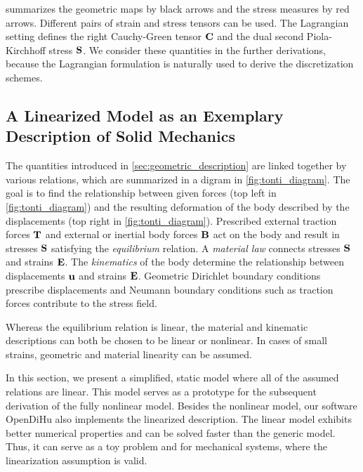  summarizes the geometric maps by black arrows and the stress measures by red arrows. 
Different pairs of strain and stress tensors can be used. 
The Lagrangian setting defines the right Cauchy-Green tensor $\textbf{C}$ and the dual second Piola-Kirchhoff stress $\textbf{S}$.
We consider these quantities in the further derivations, because the Lagrangian formulation is naturally used to derive the discretization schemes.

\subsection{A Linearized Model as an Exemplary Description of Solid Mechanics}\label{sec:linearized_mechanics_model}

The quantities introduced in \cref{sec:geometric_description} are linked together by various relations, which are summarized in a digram in \cref{fig:tonti_diagram}. The goal is to find the relationship between given forces (top left in \cref{fig:tonti_diagram}) and the resulting deformation of the body described by the displacements (top right in \cref{fig:tonti_diagram}).
Prescribed external traction forces $\textbf{T}$ and external or inertial body forces $\textbf{B}$ act on the body and result in stresses $\textbf{S}$ satisfying the \emph{equilibrium} relation. A \emph{material law} connects stresses $\textbf{S}$ and strains $\textbf{E}$. The \emph{kinematics} of the body determine the relationship between displacements $\textbf{u}$ and strains $\textbf{E}$. Geometric Dirichlet boundary conditions prescribe displacements and Neumann boundary conditions such as traction forces contribute to the stress field. 

Whereas the equilibrium relation is linear, the material and kinematic descriptions can both be chosen to be linear or nonlinear. 
In cases of small strains, geometric and material linearity can be assumed.

In this section, we present a simplified, static model where all of the assumed relations are linear. 
This model serves as a prototype for the subsequent derivation of the fully nonlinear model. Besides the nonlinear model, our software OpenDiHu also implements the linearized description. The linear model exhibits better numerical properties and can be solved faster than the generic model. Thus, it can serve as a toy problem and for mechanical systems, where the linearization assumption is valid.

